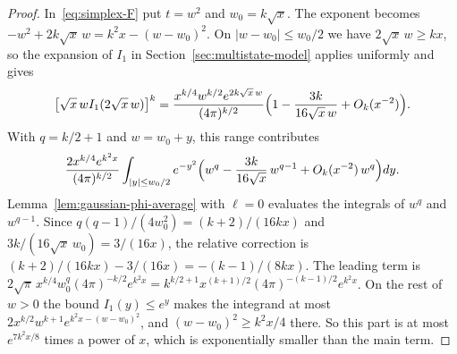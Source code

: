 \begin{proof}
In~\eqref{eq:simplex-F} put $t=w^2$ and $w_0=k\sqrt x$. The exponent becomes
$-w^2+2k\sqrt x\,w=k^2x-(w-w_0)^2$. On $|w-w_0|\le w_0/2$ we have
$2\sqrt x\,w\ge kx$, so the expansion of $I_1$ in
Section~\ref{sec:multistate-model} applies uniformly and gives
\[
\bigl[\sqrt x\,wI_1(2\sqrt x\,w)\bigr]^k
=\frac{x^{k/4}w^{k/2}e^{2k\sqrt x\,w}}{(4\pi)^{k/2}}
\Bigl(1-\frac{3k}{16\sqrt x\,w}+O_k(x^{-2})\Bigr).
\]
With $q=k/2+1$ and $w=w_0+y$, this range contributes
\[
\frac{2x^{k/4}e^{k^2x}}{(4\pi)^{k/2}}\int_{|y|\le w_0/2}e^{-y^2}
\Bigl(w^q-\frac{3k}{16\sqrt x}\,w^{q-1}+O_k(x^{-2})\,w^q\Bigr)dy .
\]
Lemma~\ref{lem:gaussian-phi-average} with $\ell=0$ evaluates the integrals of
$w^q$ and $w^{q-1}$. Since $q(q-1)/(4w_0^2)=(k+2)/(16kx)$ and
$3k/(16\sqrt x\,w_0)=3/(16x)$, the relative correction is
$(k+2)/(16kx)-3/(16x)=-(k-1)/(8kx)$. The leading term is
$2\sqrt\pi\,x^{k/4}w_0^q(4\pi)^{-k/2}e^{k^2x}
=k^{k/2+1}x^{(k+1)/2}(4\pi)^{-(k-1)/2}e^{k^2x}$. On the rest of $w>0$ the bound
$I_1(y)\le e^y$ makes the integrand at most
$2x^{k/2}w^{k+1}e^{k^2x-(w-w_0)^2}$, and $(w-w_0)^2\ge k^2x/4$ there. So this part
is at most $e^{7k^2x/8}$ times a power of $x$, which is exponentially smaller than
the main term.
\end{proof}


